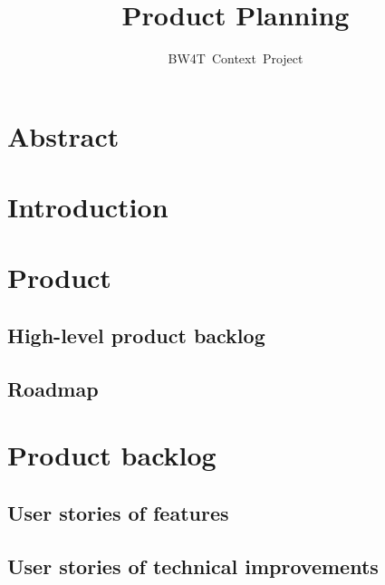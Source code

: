 \documentclass[oneside]{tudelft-report}
\begin{document}
\frontmatter

\title[Blocks World for Teams]{Product Planning}
\author{BW4T~Context~Project}
\makecover



\pagebreak
\chapter*{Abstract}


\pagebreak
\tableofcontents
\pagebreak

\setcounter{chapter}{2}

\chapter{Introduction}


\chapter{Product}
\section{High-level product backlog}


\section{Roadmap}


\setcounter{chapter}{3}
\setcounter{section}{0}

\chapter{Product backlog}
\section{User stories of features}


\section{User stories of technical improvements}

\end{document}
